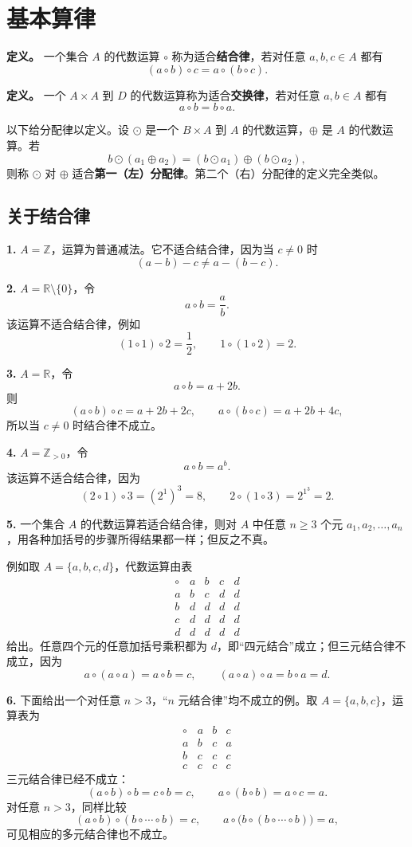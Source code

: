 \section{基本算律}

\textbf{定义。} 一个集合 $A$ 的代数运算 $\circ$ 称为适合\textbf{结合律}，若对任意 $a,b,c\in A$ 都有
\[
(a\circ b)\circ c=a\circ(b\circ c).
\]

\textbf{定义。} 一个 $A\times A$ 到 $D$ 的代数运算称为适合\textbf{交换律}，若对任意 $a,b\in A$ 都有
\[
a\circ b=b\circ a.
\]

以下给分配律以定义。设 $\odot$ 是一个 $B\times A$ 到 $A$ 的代数运算，$\oplus$ 是 $A$ 的代数运算。若
\[
b\odot(a_1\oplus a_2)=(b\odot a_1)\oplus(b\odot a_2),
\]
则称 $\odot$ 对 $\oplus$ 适合\textbf{第一（左）分配律}。第二个（右）分配律的定义完全类似。

\subsection*{关于结合律}

\textbf{1.} $A=\mathbb Z$，运算为普通减法。它不适合结合律，因为当 $c\ne0$ 时
\[
(a-b)-c\ne a-(b-c).
\]

\textbf{2.} $A=\mathbb R\setminus\{0\}$，令
\[
a\circ b=\frac ab.
\]
该运算不适合结合律，例如
\[
(1\circ1)\circ2=\frac12,
\qquad
1\circ(1\circ2)=2.
\]

\textbf{3.} $A=\mathbb R$，令
\[
a\circ b=a+2b.
\]
则
\[
(a\circ b)\circ c=a+2b+2c,
\qquad
 a\circ(b\circ c)=a+2b+4c,
\]
所以当 $c\ne0$ 时结合律不成立。

\textbf{4.} $A=\mathbb Z_{>0}$，令
\[
a\circ b=a^b.
\]
该运算不适合结合律，因为
\[
(2\circ1)\circ3=(2^1)^3=8,
\qquad
2\circ(1\circ3)=2^{1^3}=2.
\]

\textbf{5.} 一个集合 $A$ 的代数运算若适合结合律，则对 $A$ 中任意 $n\ge3$ 个元 $a_1,a_2,\ldots,a_n$，用各种加括号的步骤所得结果都一样；但反之不真。

例如取 $A=\{a,b,c,d\}$，代数运算由表
\[
\begin{array}{c|cccc}
\circ&a&b&c&d\\\hline
 a&b&c&d&d\\
 b&d&d&d&d\\
 c&d&d&d&d\\
 d&d&d&d&d
\end{array}
\]
给出。任意四个元的任意加括号乘积都为 $d$，即“四元结合”成立；但三元结合律不成立，因为
\[
a\circ(a\circ a)=a\circ b=c,
\qquad
(a\circ a)\circ a=b\circ a=d.
\]

\textbf{6.} 下面给出一个对任意 $n>3$，“$n$ 元结合律”均不成立的例。取 $A=\{a,b,c\}$，运算表为
\[
\begin{array}{c|ccc}
\circ&a&b&c\\\hline
 a&b&c&a\\
 b&c&c&c\\
 c&c&c&c
\end{array}
\]
三元结合律已经不成立：
\[
(a\circ b)\circ b=c\circ b=c,
\qquad
 a\circ(b\circ b)=a\circ c=a.
\]
对任意 $n>3$，同样比较
\[
(a\circ b)\circ(b\circ\cdots\circ b)=c,
\qquad
 a\circ\bigl(b\circ(b\circ\cdots\circ b)\bigr)=a,
\]
可见相应的多元结合律也不成立。

